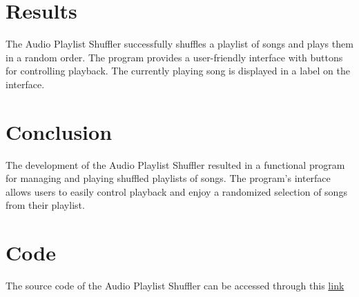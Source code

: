 \documentclass{article}
\begin{document}
\section{Results}
The Audio Playlist Shuffler successfully shuffles a playlist of songs and plays them in a random order. The program provides a user-friendly interface with buttons for controlling playback. The currently playing song is displayed in a label on the interface.

\section{Conclusion}
The development of the Audio Playlist Shuffler resulted in a functional program for managing and playing shuffled playlists of songs. The program's interface allows users to easily control playback and enjoy a randomized selection of songs from their playlist.

\section*{Code}
The source code of the Audio Playlist Shuffler can be accessed through this \href{https://github.com/GitanshuA/AI-1110/blob/master/Audio%20Playlist%20Shuffler/main.py}{link}
\end{document}
